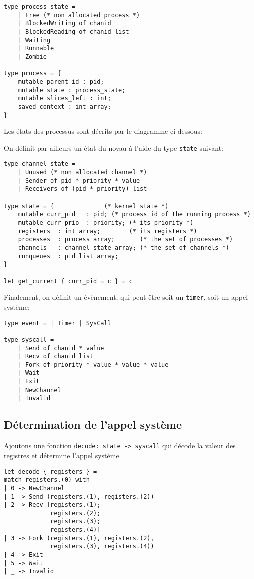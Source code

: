 \documentclass[french, toc]{../cs-classes/cs-classes}
\begin{document}
\begin{verbatim}
type process_state =
    | Free (* non allocated process *)
    | BlockedWriting of chanid
    | BlockedReading of chanid list
    | Waiting
    | Runnable
    | Zombie

type process = {
    mutable parent_id : pid;
    mutable state : process_state;
    mutable slices_left : int;
    saved_context : int array;
}
\end{verbatim}

\noindent Les états des processus sont décrits par le diagramme ci-dessous:

\noindent On définit par ailleurs un état du noyau à l'aide du type \texttt{state} suivant:
\begin{verbatim}
type channel_state =
    | Unused (* non allocated channel *)
    | Sender of pid * priority * value
    | Receivers of (pid * priority) list

type state = {              (* kernel state *)
    mutable curr_pid   : pid; (* process id of the running process *)
    mutable curr_prio  : priority; (* its priority *)
    registers  : int array;        (* its registers *)
    processes  : process array;       (* the set of processes *)
    channels   : channel_state array; (* the set of channels *)
    runqueues  : pid list array;
}

let get_current { curr_pid = c } = c
\end{verbatim}

\noindent Finalement, on définit un évènement, qui peut être soit un \texttt{timer}, soit un appel système:
\begin{verbatim}
type event = | Timer | SysCall

type syscall =
    | Send of chanid * value
    | Recv of chanid list
    | Fork of priority * value * value * value
    | Wait
    | Exit
    | NewChannel
    | Invalid
\end{verbatim}

\subsection{Détermination de l'appel système}
Ajoutons une fonction \texttt{decode: state -> syscall} qui décode la valeur des registres et détermine l'appel système.
\begin{verbatim}
let decode { registers } =
match registers.(0) with
| 0 -> NewChannel
| 1 -> Send (registers.(1), registers.(2))
| 2 -> Recv [registers.(1);
             registers.(2);
             registers.(3);
             registers.(4)]
| 3 -> Fork (registers.(1), registers.(2),
             registers.(3), registers.(4))
| 4 -> Exit
| 5 -> Wait
| _ -> Invalid
\end{verbatim}
\end{document}
